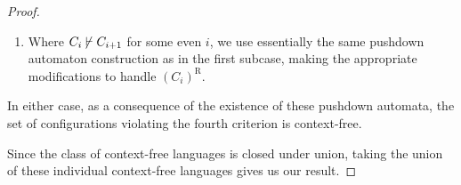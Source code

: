 \begin{lemma}
\begin{proof}
\begin{enumerate}
\begin{enumerate}
	\item Where $C_{i} \mkern-2mu\not\mkern2mu\vdash C_{i+1}$ for some even $i$, we use essentially the same pushdown automaton construction as in the first subcase, making the appropriate modifications to handle $(C_{i})^{\text{R}}$.
	\end{enumerate}
In either case, as a consequence of the existence of these pushdown automata, the set of configurations violating the fourth criterion is context-free.
\end{enumerate}
Since the class of context-free languages is closed under union, taking the union of these individual context-free languages gives us our result.
\end{proof}
\end{lemma}